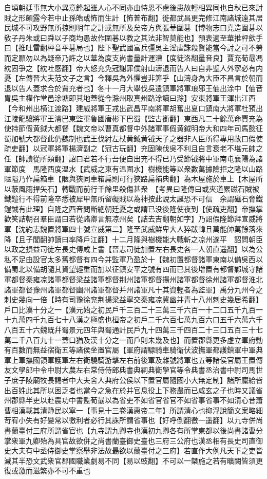 自頃朝廷事無大小異意鋒起雖人心不同亦由恃恩不慮後患故輕相異同也自秋已來討賊之形頗露今若中止孫皓或怖而生計【怖普布翻】徙都武昌更完修江南諸城遠其居民城不可攻野無所掠則明年之計或無所及矣帝方與張華圍碁【博物志曰堯造圍碁以敎子丹朱或曰舜以子商均愚故作圍碁以教之其法非智莫能也】預表適至華推枰歛手曰【推吐雷翻枰音平碁局也】陛下聖武國富兵彊吳主淫虐誅殺賢能當今討之可不勞而定願勿以為疑帝乃許之以華為度支尚書量計運漕【度徒洛翻量音良】賈充荀朂馮紞固爭之【紞吐感翻】帝大怒充免冠謝罪僕射山濤退而告人曰自非聖人外寧必有内憂【左傳晉大夫范文子之言】今釋吳為外懼豈非筭乎【山濤身為大臣不昌言於朝而退以告人蓋求合於賈充者也】冬十一月大舉伐吳遣鎮軍將軍琅邪王伷出涂中【伷音胄吳主權作堂邑涂塘即其地蓋從今滁州取真州路涂讀曰滁】安東將軍王渾出江西【今和州出横江渡路】建威將軍王戎出武昌平南將軍胡奮出夏口鎮南大將軍杜預出江陵龍驤將軍王濬巴東監軍魯國唐彬下巴蜀【監古銜翻】東西凡二十餘萬命賈充為使持節假黄鉞大都督【魏文帝以曹真都督中外諸軍事假黄鉞明帝大和四年司馬懿征蜀加號大都督此仍魏制也武王伐紂左杖黄鉞黄钺天子之器非人臣所得專用故曰假使疏吏翻】以冠軍將軍楊濟副之【冠古玩翻】充固陳伐吳不利且自言衰老不堪元帥之任【帥讀從所類翻】詔曰君若不行吾便自出充不得已乃受節钺將中軍南屯襄陽為諸軍節度　馬隆西度温水【武威之東有温圍水】樹機能等以衆數萬據險拒之隆以山路陿隘乃作扁箱車【陿與狹同車箱扁則可行狹路扁補典翻】為木屋施於車上【木屋所以蔽風雨捍矢石】轉戰而前行千餘里殺傷甚衆　【考異曰隆傳曰或夾道累磁石賊被鐵鎧行不得前隆卒悉被犀甲無所留礙賊以為神按此說太誕恐不可信　余謂磁石脅鐵鎧誠有此理】自隆之西音問斷絶朝廷憂之或謂已没後隆使夜到【使疏吏翻】帝撫掌歡笑詰朝召羣臣謂曰若從諸卿言無凉州矣【詰去吉翻朝如字】乃詔假隆節拜宣威將軍【沈約志魏置將軍四十號宣威第二】隆至武威鮮卑大人猝跋韓且萬能帥萬餘落來降【且子閭翻帥讀曰率降戶江翻】十二月隆與樹機能大戰斬之凉州遂平　詔問朝臣以政之損益司徒左長史傅咸上書【晉志司徒加置左右長史各一人朝直遥翻】以為公私不足由設官太多舊都督有四今并監軍乃盈於十【魏初置都督諸軍東南以備吳西以備蜀北以備胡隨其資望輕重而加以征鎮安平之號有四而已其後增置有都督鄴城守諸軍都督秦雍凉諸軍都督梁益諸軍都督荆州諸軍都督揚州諸軍都督徐州諸軍都督淮北諸軍都督豫州諸軍都督幽州諸軍都督并州諸軍凡十其資輕者為監軍】禹分九州今之刺史幾向一倍【時有司豫徐兖荆揚梁益寧交秦雍凉冀幽并青十八州刺史幾居希翻】戶口比漢十分之一【漢元始之初民戶千三百二十三萬三千六百一十二口五千九百一十九萬四千九百七十八漢之極盛也桓帝之初戶二千六百七萬九百六口五千六萬六千八百五十六魏既幷蜀景元四年與蜀通計民戶九十四萬三千四百二十三口五百三十七萬二千八百九十一蓋口猶及漢十分之一而戶則未幾及也】而置郡縣更多虛立軍府動有百數而無益宿衛五等諸侯坐置官屬【軍府謂驃騎車騎衛伏波撫軍都護鎮軍中軍典軍上軍撫國領軍護軍左右衛驍騎游擊左右前後軍及雜號將軍也五等諸侯官屬王置傳友文學郎中令中尉大農左右常侍侍郎典書典祠典衛學官等令典書丞治書中尉司馬世子庶子陵廟牧長謁者中大夫舍人典府公侯以下置官屬隨國小大無定制】諸所廩給皆出百姓此其所以困乏者也當今之急在於并官息役上下務農而已咸玄之子也時又議省州郡縣半吏以赴農功中書監荀朂以為省吏不如省官省官不如省事省事不如清心昔蕭曹相漢載其清静民以寧一【事見十三卷漢惠帝二年】所謂清心也抑浮說簡文案略細苛宥小失有好變常以徼利者必行其誅所謂省事也【好呼倒翻徼一遥翻】以九寺併尚書蘭臺付三府所謂省官也【九寺謂九卿寺也漢初九卿各有所掌東都以後尚書諸曹分掌衆軍九卿殆為具官故欲併之尚書蘭臺御史臺也三府三公府也漢丞相有長史司直御史大夫有中丞侍御史掌察舉非法故朂欲以蘭臺付之三府】若直作大例凡天下之吏皆減其半恐文武衆官郡國職業劇易不同【易以豉翻】不可以一槩施之若有曠闕皆須更復或激而滋繁亦不可不重也

